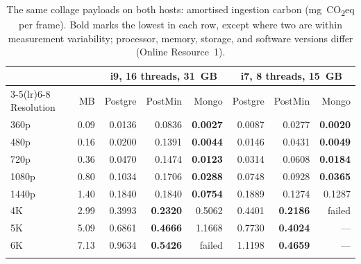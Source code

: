 \documentclass[pdflatex,sn-basic]{sn-jnl}%
\begin{document}
\begin{table}[htbp]
\color{markup}
\caption{The same collage payloads on both hosts: amortised ingestion carbon (mg~CO\textsubscript{2}eq per frame). Bold marks the lowest in each row, except where two are within measurement variability; processor, memory, storage, and software versions differ (Online Resource~1).}\label{tab:twohosts}
\small
\setlength{\tabcolsep}{4pt}
\begin{tabular}{@{}lr rrr rrr@{}}
\toprule
 & & \multicolumn{3}{c}{i9, 16 threads, 31~GB} & \multicolumn{3}{c}{i7, 8 threads, 15~GB} \\
\cmidrule(lr){3-5}\cmidrule(lr){6-8}
Resolution & MB & Postgre & PostMin & Mongo & Postgre & PostMin & Mongo \\
\midrule
360p  & 0.09 & 0.0136 & 0.0836 & \textbf{0.0027} & 0.0087 & 0.0277 & \textbf{0.0020} \\
480p  & 0.16 & 0.0200 & 0.1391 & \textbf{0.0044} & 0.0146 & 0.0431 & \textbf{0.0049} \\
720p  & 0.36 & 0.0470 & 0.1474 & \textbf{0.0123} & 0.0314 & 0.0608 & \textbf{0.0184} \\
1080p & 0.80 & 0.1034 & 0.1706 & \textbf{0.0288} & 0.0748 & 0.0928 & \textbf{0.0365} \\
\midrule
1440p & 1.40 & 0.1840 & 0.1840 & \textbf{0.0754} & 0.1889 & 0.1274 & 0.1287 \\
4K    & 2.99 & 0.3993 & \textbf{0.2320} & 0.5062 & 0.4401 & \textbf{0.2186} & failed \\
5K    & 5.09 & 0.6861 & \textbf{0.4666} & 1.1668 & 0.7730 & \textbf{0.4024} & --- \\
6K    & 7.13 & 0.9634 & \textbf{0.5426} & failed & 1.1198 & \textbf{0.4659} & --- \\
\botrule
\end{tabular}
\end{table}
\end{document}
